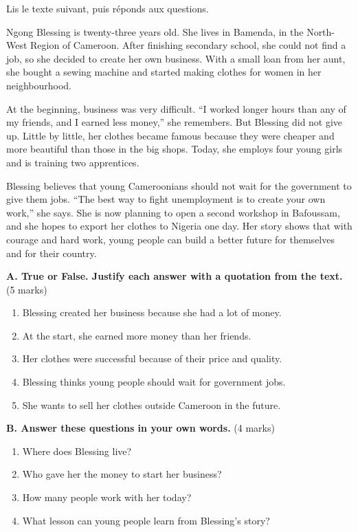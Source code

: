 \documentclass[11pt]{article}
\begin{document}
\begin{exercice}
Lis le texte suivant, puis réponds aux questions.

\begin{textebox}
Ngong Blessing is twenty-three years old. She lives in Bamenda, in the North-West Region of Cameroon. After finishing secondary school, she could not find a job, so she decided to create her own business. With a small loan from her aunt, she bought a sewing machine and started making clothes for women in her neighbourhood.

At the beginning, business was very difficult. “I worked longer hours than any of my friends, and I earned less money,” she remembers. But Blessing did not give up. Little by little, her clothes became famous because they were cheaper and more beautiful than those in the big shops. Today, she employs four young girls and is training two apprentices.

Blessing believes that young Cameroonians should not wait for the government to give them jobs. “The best way to fight unemployment is to create your own work,” she says. She is now planning to open a second workshop in Bafoussam, and she hopes to export her clothes to Nigeria one day. Her story shows that with courage and hard work, young people can build a better future for themselves and for their country.
\end{textebox}

\textbf{A. True or False. Justify each answer with a quotation from the text.} (5 marks)
\begin{enumerate}
\item Blessing created her business because she had a lot of money.
\item At the start, she earned more money than her friends.
\item Her clothes were successful because of their price and quality.
\item Blessing thinks young people should wait for government jobs.
\item She wants to sell her clothes outside Cameroon in the future.
\end{enumerate}

\textbf{B. Answer these questions in your own words.} (4 marks)
\begin{enumerate}
\item Where does Blessing live?
\item Who gave her the money to start her business?
\item How many people work with her today?
\item What lesson can young people learn from Blessing's story?
\end{enumerate}


\end{exercice}
\end{document}

